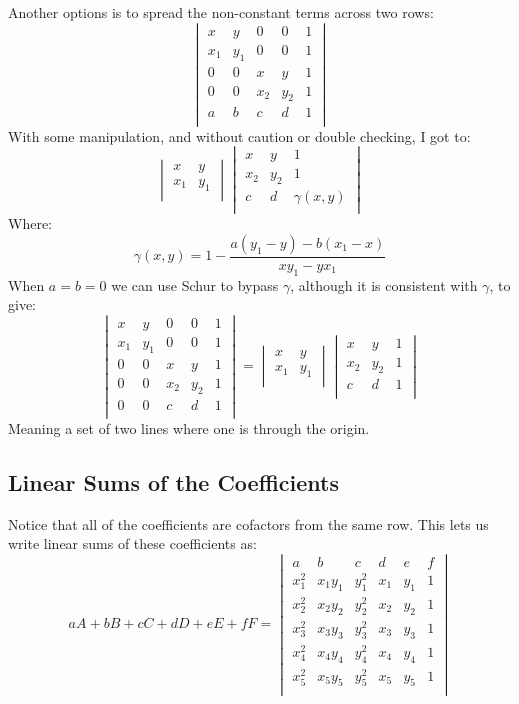 Another options is to spread the non-constant terms across two rows:
\[\begin{vmatrix}
	x&y&0&0&1\\
	x_1&y_1&0&0&1\\
	0&0&x&y&1\\
	0&0&x_2&y_2&1\\
	a&b&c&d&1\\
\end{vmatrix}\]
With some manipulation,
and without caution or double checking,
I got to:
\[\begin{vmatrix}
	x&y\\
	x_1&y_1\\
\end{vmatrix}
\begin{vmatrix}
	x&y&1\\
	x_2&y_2&1\\
	c&d&\gamma(x,y)\\
\end{vmatrix}\]
Where:
\[\gamma(x,y) = 1 -\frac{a(y_1-y)-b(x_1-x)}{xy_1-yx_1}\]
When $a=b=0$ we can use Schur to bypass $\gamma$,
although it is consistent with $\gamma$,
to give: 
\[\begin{vmatrix}
	x&y&0&0&1\\
	x_1&y_1&0&0&1\\
	0&0&x&y&1\\
	0&0&x_2&y_2&1\\
	0&0&c&d&1\\
\end{vmatrix}
=
\begin{vmatrix}
	x&y\\
	x_1&y_1\\
\end{vmatrix}
\begin{vmatrix}
	x&y&1\\
	x_2&y_2&1\\
	c&d&1\\
\end{vmatrix}\]
Meaning a set of two lines where one is through the origin.

\subsection{Linear Sums of the Coefficients}
Notice that all of the coefficients are cofactors from the same row.
This lets us write linear sums of these coefficients as:
\[
	aA+bB+cC+dD+eE+fF =
	\begin{vmatrix}
	a&b&c&d&e&f\\
	x_1^2&x_1y_1&y_1^2&x_1&y_1&1\\
	x_2^2&x_2y_2&y_2^2&x_2&y_2&1\\
	x_3^2&x_3y_3&y_3^2&x_3&y_3&1\\
	x_4^2&x_4y_4&y_4^2&x_4&y_4&1\\
	x_5^2&x_5y_5&y_5^2&x_5&y_5&1\\
	\end{vmatrix}
\]

